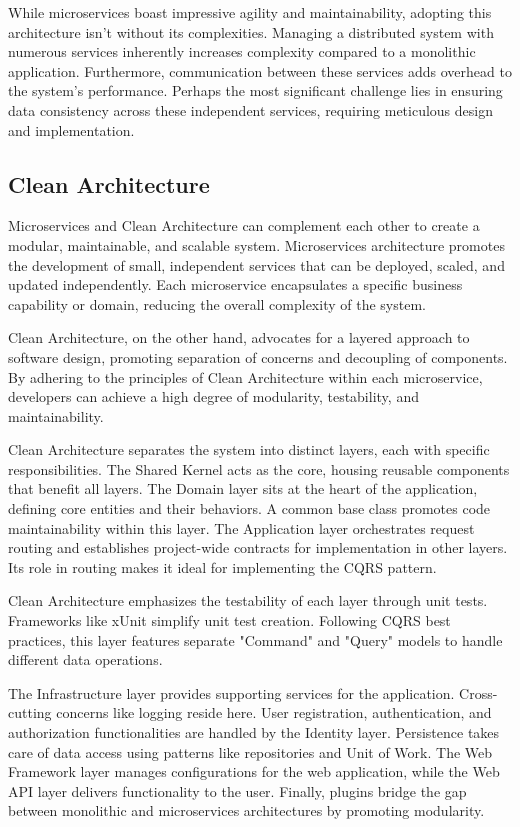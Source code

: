 While microservices boast impressive agility and maintainability, adopting this
architecture isn't without its complexities.  Managing a distributed system with
numerous services inherently increases complexity compared to a monolithic
application.  Furthermore, communication between these services adds overhead to
the system's performance.  Perhaps the most significant challenge lies in
ensuring data consistency across these independent services, requiring
meticulous design and implementation.

\subsection{Clean Architecture}

Microservices and Clean Architecture can complement each other to create a
modular, maintainable, and scalable system. Microservices architecture promotes
the development of small, independent services that can be deployed, scaled, and
updated independently. Each microservice encapsulates a specific business
capability or domain, reducing the overall complexity of the system.

Clean Architecture, on the other hand, advocates for a layered approach to
software design, promoting separation of concerns and decoupling of components.
By adhering to the principles of Clean Architecture within each microservice,
developers can achieve a high degree of modularity, testability, and
maintainability.

Clean Architecture separates the system into distinct layers, each with specific
responsibilities. The Shared Kernel acts as the core, housing reusable
components that benefit all layers. The Domain layer sits at the heart of the
application, defining core entities and their behaviors. A common base class
promotes code maintainability within this layer. The Application layer
orchestrates request routing and establishes project-wide contracts for
implementation in other layers. Its role in routing makes it ideal for
implementing the CQRS pattern.

Clean Architecture emphasizes the testability of each layer through unit tests.
Frameworks like xUnit simplify unit test creation. Following CQRS best
practices, this layer features separate "Command" and "Query" models to handle
different data operations.

The Infrastructure layer provides supporting services for the application.
Cross-cutting concerns like logging reside here. User registration,
authentication, and authorization functionalities are handled by the Identity
layer. Persistence takes care of data access using patterns like repositories
and Unit of Work. The Web Framework layer manages configurations for the web
application, while the Web API layer delivers functionality to the user.
Finally, plugins bridge the gap between monolithic and microservices
architectures by promoting modularity.

